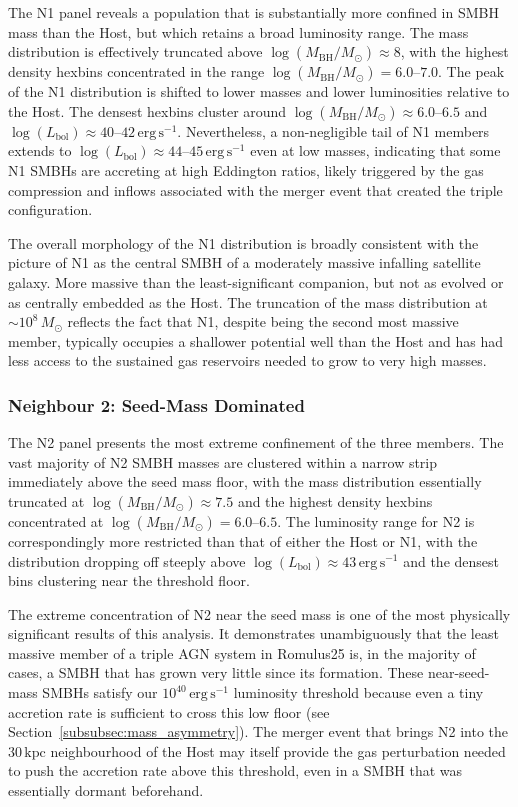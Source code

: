 \documentclass[twocolumn, 10pt]{article}
\begin{document}
The N1 panel reveals a population that is substantially more confined in SMBH mass than the Host, but which retains a broad luminosity range. The mass distribution is effectively truncated above $\log(M_\mathrm{BH}/M_\odot) \approx 8$, with the highest density hexbins concentrated in the range $\log(M_\mathrm{BH}/M_\odot) = 6.0$--$7.0$. The peak of the N1 distribution is shifted to lower masses and lower luminosities relative to the Host. The densest hexbins cluster around $\log(M_\mathrm{BH}/M_\odot) \approx 6.0$--$6.5$ and $\log(L_\mathrm{bol}) \approx 40$--$42\,\mathrm{erg\,s^{-1}}$. Nevertheless, a non-negligible tail of N1 members extends to $\log(L_\mathrm{bol}) \approx 44$--$45\,\mathrm{erg\,s^{-1}}$ even at low masses, indicating that some N1 SMBHs are accreting at high Eddington ratios, likely triggered by the gas compression and inflows associated with the merger event that created the triple configuration.
 
The overall morphology of the N1 distribution is broadly consistent with the picture of N1 as the central SMBH of a moderately massive infalling satellite galaxy. More massive than the least-significant companion, but not as evolved or as centrally embedded as the Host. The truncation of the mass distribution at $\sim 10^8\,M_\odot$ reflects the fact that N1, despite being the second most massive member, typically occupies a shallower potential well than the Host and has had less access to the sustained gas reservoirs needed to grow to very high masses.
 
\subsubsection{Neighbour 2: Seed-Mass Dominated}
\label{subsubsec:hexbin_n2}
 
The N2 panel presents the most extreme confinement of the three members. The vast majority of N2 SMBH masses are clustered within a narrow strip immediately above the seed mass floor, with the mass distribution essentially truncated at $\log(M_\mathrm{BH}/M_\odot) \approx 7.5$ and the highest density hexbins concentrated at $\log(M_\mathrm{BH}/M_\odot) = 6.0$--$6.5$. The luminosity range for N2 is correspondingly more restricted than that of either the Host or N1, with the distribution dropping off steeply above $\log(L_\mathrm{bol}) \approx 43\,\mathrm{erg\,s^{-1}}$ and the densest bins clustering near the threshold floor.
 
The extreme concentration of N2 near the seed mass is one of the most physically significant results of this analysis. It demonstrates unambiguously that the least massive member of a triple AGN system in Romulus25 is, in the majority of cases, a SMBH that has grown very little since its formation. These near-seed-mass SMBHs satisfy our $10^{40}\,\mathrm{erg\,s^{-1}}$ luminosity threshold because even a tiny accretion rate is sufficient to cross this low floor (see Section~\ref{subsubsec:mass_asymmetry}). The merger event that brings N2 into the $30\,\mathrm{kpc}$ neighbourhood of the Host may itself provide the gas perturbation needed to push the accretion rate above this threshold, even in a SMBH that was essentially dormant beforehand.
 
\end{document}
